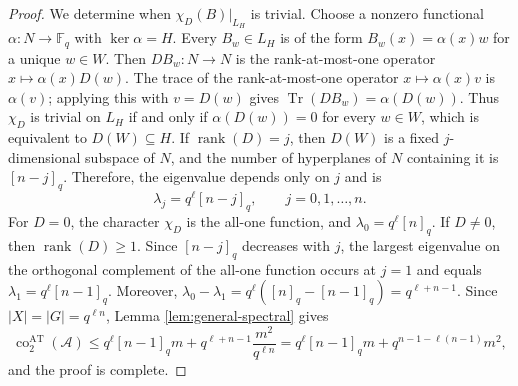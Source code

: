 \documentclass[11pt]{article}
\theoremstyle{definition}
\newcommand{\Fq}{\mathbb F_q}
\newcommand{\rank}{\operatorname{rank}}
\newcommand{\Tr}{\operatorname{Tr}}
\begin{document}
\begin{proof}
We determine when $\chi_D(B)|_{L_H}$ is trivial. Choose a nonzero functional $\alpha:N\to\Fq$ with $\ker\alpha=H$.  Every $B_w\in L_H$ is of the form $B_w(x)=\alpha(x)w$ for a unique $w\in W$. Then $DB_w:N\to N$ is the rank-at-most-one  operator $x\longmapsto \alpha(x)D(w)$. The trace of the rank-at-most-one operator $x\mapsto\alpha(x)v$ is $\alpha(v)$; applying this with $v=D(w)$ gives $\Tr(DB_w)=\alpha(D(w))$. Thus $\chi_D$ is trivial on $L_H$ if and only if $\alpha(D(w))=0$ for every $w\in W$, which is equivalent to $D(W)\subseteq H$. If $\rank(D)=j$, then $D(W)$ is a fixed $j$-dimensional subspace of $N$, and the number of hyperplanes of $N$ containing it is $[n-j]_q$.  Therefore, the eigenvalue depends only on $j$ and is
\[
\lambda_j=q^\ell[n-j]_q, \qquad j=0,1,\ldots,n.
\]
For $D=0$, the character $\chi_D$ is the all-one function, and $\lambda_0=q^\ell[n]_q$. If $D\neq0$, then $\rank(D)\geq1$. Since $[n-j]_q$ decreases with $j$, the largest eigenvalue on the
orthogonal complement of the all-one function occurs at $j=1$ and equals $\lambda_1=q^\ell[n-1]_q$. 
Moreover, $\lambda_0-\lambda_1=q^\ell([n]_q-[n-1]_q)=q^{\ell+n-1}$. Since $|X|=|G|=q^{\ell n}$, Lemma \ref{lem:general-spectral} gives
\[
\operatorname{co}^{\mathrm{AT}}_2(\mathcal A)
\le q^\ell[n-1]_qm+q^{\ell+n-1}\frac{m^2}{q^{\ell n}}
=q^\ell[n-1]_qm+q^{n-1-\ell(n-1)}m^2, 
\]
and the proof is complete.
\end{proof}
\end{document}
